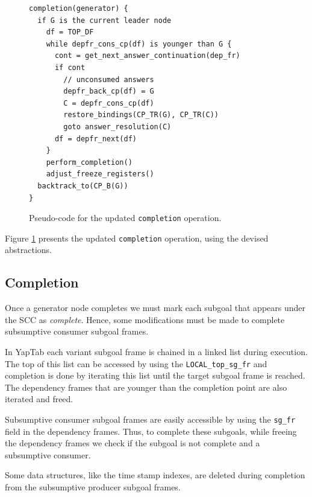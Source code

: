 \begin{figure}[ht]
\begin{Verbatim}
completion(generator) {
  if G is the current leader node
    df = TOP_DF
    while depfr_cons_cp(df) is younger than G {
      cont = get_next_answer_continuation(dep_fr)
      if cont
        // unconsumed answers
        depfr_back_cp(df) = G
        C = depfr_cons_cp(df)
        restore_bindings(CP_TR(G), CP_TR(C))
        goto answer_resolution(C)
      df = depfr_next(df)
    }
    perform_completion()
    adjust_freeze_registers()
  backtrack_to(CP_B(G))
}
\end{Verbatim}
\caption{Pseudo-code for the updated \texttt{completion} operation.}
\label{fig:completion_operation}
\end{figure}

Figure \ref{fig:completion_operation} presents the updated \texttt{completion} operation,
using the devised abstractions.

\subsection{Completion}

Once a generator node completes we must mark each subgoal that appears under the SCC as \textit{complete}.
Hence, some modifications must be made to complete subsumptive consumer subgoal frames.

In YapTab each variant subgoal frame is chained in a linked list during execution. The top of this list
can be accessed by using the \texttt{LOCAL\_top\_sg\_fr} and completion is done by iterating this list until
the target subgoal frame is reached. The dependency frames that are younger than the completion point
are also iterated and freed. 

Subsumptive consumer subgoal frames are easily accessible by using the \texttt{sg\_fr} field in the dependency frames.
Thus, to complete these subgoals, while freeing the dependency frames we check if the subgoal is not complete and a
subsumptive consumer.

Some data structures, like the time stamp indexes, are deleted during completion from the
subsumptive producer subgoal frames.

